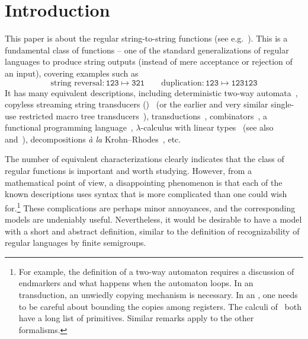 \section{Introduction}
\label{sec:intro}

This paper is about the regular string-to-string functions (see e.g.~\cite{MuschollPuppis}). This is a
fundamental class of functions -- one of the standard generalizations of regular languages to produce string
outputs (instead of mere acceptance or rejection of an input), covering examples such as
\[ \text{string reversal}\colon \mathtt{123 \mapsto 321} \qquad \text{duplication}\colon \mathtt{123 \mapsto 123123}\]
It has many equivalent descriptions, including deterministic two-way automata~\cite[Note~4]{shepherdson1959reduction}, copyless streaming string transducers (\sst)~\cite[Section~3]{alurExpressivenessStreamingString2010} (or the earlier and very similar single-use restricted macro tree transducers~\cite[Section~5]{MacroMSO}), \mso transductions~\cite[Theorem~13]{engelfrietMSODefinableString2001}, combinators~\cite[Section~2]{alur2014regular}, a functional programming language~\cite[Section~6]{bojanczykRegularFirstOrderList2018}, $\lambda$-calculus with linear types~\cite[Theorem~3]{LambdaTransducer} (see also~\cite[Claim~6.2]{IATLC} and~\cite[Theorem~1.2.3]{titoPhD}), decompositions \textit{à la} Krohn--Rhodes~\cite[Theorem~18, item~4]{bojanczykstefanski2020}, etc.

The number of equivalent characterizations clearly indicates that
the class of regular functions is important and worth studying. However, from a mathematical point of view, a disappointing phenomenon is that each of the known descriptions uses syntax that is more complicated than one could wish for.\footnote{For example, the definition of a two-way automaton requires a discussion of endmarkers and what happens when the automaton loops. In an \mso transduction, an unwiedly copying mechanism is necessary. In an \sst, one needs to be careful about bounding the copies among registers.
The calculi of~\cite{alur2014regular,bojanczykRegularFirstOrderList2018} both have a long list of primitives.
Similar remarks apply to the other formalisms.}
These complications are perhaps minor annoyances, and the corresponding models are undeniably useful. Nevertheless, it would be desirable to have a model with a short and abstract definition, similar to the definition of recognizability of regular languages by finite semigroups. %

